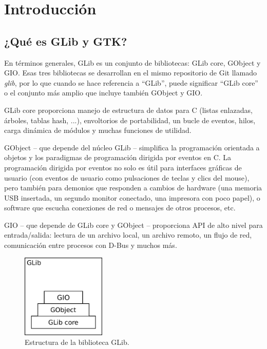 \chapter{Introducción}

\section{¿Qué es GLib y GTK?}

En términos generales, GLib es un conjunto de bibliotecas: GLib core, GObject y GIO. Esas tres bibliotecas se desarrollan en el mismo repositorio de Git llamado \emph{glib}, por lo que cuando se hace referencia a ``GLib'', puede significar ``GLib core'' o el conjunto más amplio que incluye también GObject y GIO.

GLib core proporciona manejo de estructura de datos para C (listas enlazadas, árboles, tablas hash, ...), envoltorios de portabilidad, un bucle de eventos, hilos, carga dinámica de módulos y muchas funciones de utilidad.

GObject -- que depende del núcleo GLib -- simplifica la programación orientada a objetos y los paradigmas de programación dirigida por eventos en C. La programación dirigida por eventos no solo es útil para interfaces gráficas de usuario (con eventos de usuario como pulsaciones de teclas y clics del mouse), pero también para demonios que responden a cambios de hardware (una memoria USB insertada, un segundo monitor conectado, una impresora con poco papel), o software que escucha conexiones de red o mensajes de otros procesos, etc.

GIO -- que depende de GLib core y GObject -- proporciona API de alto nivel para entrada/salida: lectura de un archivo local, un archivo remoto, un flujo de red, comunicación entre procesos con D-Bus y muchos más.

\begin{figure}
    \centering
    \includegraphics[width=4cm]{assets/img/diag/glib-struct-001.pdf}
    \caption{Estructura de la biblioteca GLib.}
    \label{fig-glib-struct-001}
\end{figure}


